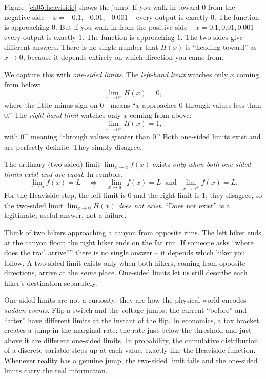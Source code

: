 Figure~\ref{ch05:heaviside} shows the jump. If you walk in toward $0$ from the negative side --
$x = -0.1, -0.01, -0.001$ -- every output is exactly $0$. The function is approaching $0$. But if you walk in from the positive side --
$x = 0.1, 0.01, 0.001$ -- every output is exactly $1$. The function is approaching $1$. The two
sides give different answers. There is no single number that $H(x)$ is ``heading toward'' as $x
\to 0$, because it depends entirely on which direction you came from.

We capture this with \emph{one-sided limits}. The \emph{left-hand limit} watches only $x$
coming from below:
\[
  \lim_{x \to 0^-} H(x) = 0,
\]
where the little minus sign on $0^-$ means ``$x$ approaches $0$ through values less than $0$.''
The \emph{right-hand limit} watches only $x$ coming from above:
\[
  \lim_{x \to 0^+} H(x) = 1,
\]
with $0^+$ meaning ``through values greater than $0$.'' Both one-sided limits exist and are
perfectly definite. They simply disagree.

\begin{focusbox}
The ordinary (two-sided) limit $\lim_{x\to a} f(x)$ exists \emph{only when both one-sided limits
exist and are equal}. In symbols,
\[
  \lim_{x \to a} f(x) = L
  \quad\Longleftrightarrow\quad
  \lim_{x \to a^-} f(x) = L \ \text{ and }\ \lim_{x \to a^+} f(x) = L.
\]
For the Heaviside step, the left limit is $0$ and the right limit is $1$; they disagree, so the
two-sided limit $\lim_{x\to 0} H(x)$ \emph{does not exist}. ``Does not exist'' is a legitimate,
useful answer, not a failure.
\end{focusbox}

\begin{intuitionbox}
Think of two hikers approaching a canyon from opposite rims. The left hiker ends at the canyon
floor; the right hiker ends on the far rim. If someone asks ``where does the trail arrive?''
there is no single answer -- it depends which hiker you follow. A two-sided limit exists only
when both hikers, coming from opposite directions, arrive at the \emph{same} place. One-sided
limits let us still describe each hiker's destination separately.
\end{intuitionbox}

\begin{applicationbox}
One-sided limits are not a curiosity; they are how the physical world encodes \emph{sudden
events}. Flip a switch and the voltage jumps; the current ``before'' and ``after'' have
different limits at the instant of the flip. In economics, a tax bracket creates a jump in the
marginal rate: the rate just below the threshold and just above it are different one-sided
limits. In probability, the cumulative distribution of a discrete variable steps up at each
value, exactly like the Heaviside function. Whenever reality has a genuine jump, the two-sided
limit fails and the one-sided limits carry the real information.
\end{applicationbox}

